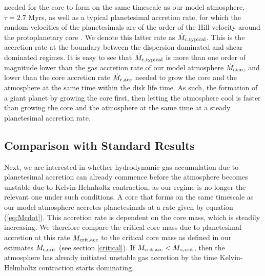 \documentclass[apj]{emulateapj}
\begin{document}
\noindent needed for the core to form on the same timescale as our model atmosphere, $\tau=2.7$ Myrs, as well as a typical planetesimal accretion rate, for which the random velocities of the planetesimals are of the order of the Hill velocity around the protoplanetary core \citep{goldreich04}. We denote this latter rate as $\dot{M}_{\rm{c,typical}}$. This is the accretion rate at the boundary between the dispersion dominated and shear dominated regimes. It is easy to see that  $\dot{M}_{\rm{c,typical}}$ is more than one order of magnitude lower than the gas accretion rate of our model atmosphere $\dot{M}_{\rm{atm}}$, and lower than the core accretion rate $\dot{M}_{\rm{c,acc}}$ needed to grow the core and the atmosphere at the same time within the disk life time. As such, the formation of a giant planet by growing the core first, then letting the atmosphere cool is faster than growing the core and the atmosphere at the same time at a steady planetesimal accretion rate.

\subsection{Comparison with Standard Results}
\label{raf2}

Next, we are interested in whether hydrodynamic gas accumulation due to planetesimal accretion can already commence before the atmosphere becomes unstable due to Kelvin-Helmholtz contraction, as our regime is no longer the relevant one under such conditions. A core that forms on the same timescale as our model atmosphere accretes planetesimals at a rate given by equation (\ref{eq:Mcdot}). This accretion rate is dependent on the core mass, which is steadily increasing. We therefore compare the critical core mass due to planetesimal accretion at this rate $M_{\rm{crit,acc}}$ to the critical core mass as defined in our estimates $M_{\rm{c,crit}}$ (see section \ref{critical}). If $M_{\rm{crit,acc}}<M{\rm_{c, crit}}$, then the atmosphere has already initiated unstable gas accretion by the time Kelvin-Helmholtz contraction starts dominating. 


\end{document}
